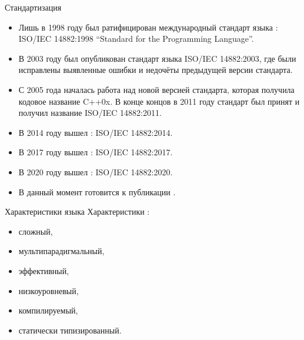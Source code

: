 \documentclass[aspectration=1610,t]{beamer}
\begin{document}
\begin{frame}{Стандартизация \langcpp}
    \begin{itemize}
        \item Лишь в 1998 году был ратифицирован международный стандарт языка 
            \langcpp: ISO/IEC 14882:1998 ``Standard for the \langcpp Programming
            Language''.
        \item В 2003 году был опубликован стандарт языка ISO/IEC 14882:2003, где были
            исправлены выявленные ошибки и недочёты предыдущей версии стандарта.
        \item С 2005 года началась работа над новой версией стандарта, которая
            получила кодовое название C++0x. В конце концов в 2011 году стандарт 
            был принят и получил название \langcpp[11] ISO/IEC 14882:2011. 
        \item В 2014 году вышел \langcpp[14]: ISO/IEC 14882:2014.
        \item В 2017 году вышел \langcpp[17]: ISO/IEC 14882:2017.
        \item В 2020 году вышел \langcpp[20]: ISO/IEC 14882:2020.
        \item В данный момент готовится к публикации \langcpp[23].
    \end{itemize}
\end{frame}

\begin{frame}{Характеристики языка \langcpp}
    Характеристики \langcpp:
    \begin{itemize}
        \item сложный,
        \item мультипарадигмальный,
        \item эффективный,
        \item низкоуровневый,
        \item компилируемый,
        \item статически типизированный.
    \end{itemize}
\end{frame}
\end{document}
